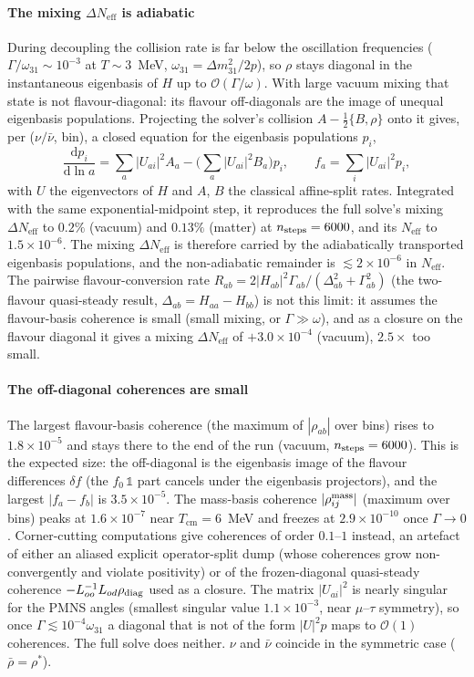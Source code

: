 \documentclass[11pt]{article}
\newcommand{\Neff}{N_{\mathrm{eff}}}
\newcommand{\Tcm}{T_{\mathrm{cm}}}
\newcommand{\dd}{\mathrm{d}}
\newcommand{\dNeff}{\Delta\Neff}
\begin{document}
\paragraph{The mixing $\dNeff$ is adiabatic}
During decoupling the collision rate is far below the oscillation frequencies
($\Gamma/\omega_{31}\sim10^{-3}$ at $T\sim3$~MeV, $\omega_{31}=\Delta m^2_{31}/2p$), so $\rho$ stays
diagonal in the instantaneous eigenbasis of $H$ up to $\mathcal O(\Gamma/\omega)$.  With large
vacuum mixing that state is not flavour-diagonal: its flavour off-diagonals are the image of
unequal eigenbasis populations.  Projecting the solver's collision $A-\tfrac12\{B,\rho\}$ onto it
gives, per ($\nu/\bar\nu$, bin), a closed equation for the eigenbasis populations $p_i$,
\begin{equation*}
\frac{\dd p_i}{\dd\ln a}=\sum_a|U_{ai}|^2A_a-\Big(\sum_a|U_{ai}|^2B_a\Big)p_i,\qquad
f_a=\sum_i|U_{ai}|^2p_i,
\end{equation*}
with $U$ the eigenvectors of $H$ and $A$, $B$ the classical affine-split rates.  Integrated with
the same exponential-midpoint step, it reproduces the full solve's mixing $\dNeff$ to $0.2\%$
(vacuum) and $0.13\%$ (matter) at $n_{\rm steps}=6000$, and its $\Neff$ to
$1.5\times10^{-6}$.  The mixing $\dNeff$ is therefore carried by the adiabatically transported
eigenbasis populations, and the non-adiabatic remainder is $\lesssim2\times10^{-6}$ in $\Neff$.
The pairwise flavour-conversion rate $R_{ab}=2|H_{ab}|^2\Gamma_{ab}/(\Delta_{ab}^2+\Gamma_{ab}^2)$
(the two-flavour quasi-steady result, $\Delta_{ab}=H_{aa}-H_{bb}$) is not this limit: it assumes the
flavour-basis coherence is small (small mixing, or $\Gamma\gg\omega$), and as a closure on the
flavour diagonal it gives a mixing $\dNeff$ of $+3.0\times10^{-4}$ (vacuum), $2.5\times$ too small.

\paragraph{The off-diagonal coherences are small}
The largest flavour-basis coherence (the maximum of $|\rho_{ab}|$ over bins) rises to
$1.8\times10^{-5}$ and stays there to the end of the run (vacuum, $n_{\rm steps}=6000$).  This is
the expected size: the off-diagonal is the eigenbasis image of the flavour differences $\delta f$
(the $f_0\,\mathbb 1$ part cancels under the eigenbasis projectors), and the largest $|f_a-f_b|$ is
$3.5\times10^{-5}$.  The mass-basis coherence $|\rho^{\rm mass}_{ij}|$ (maximum over bins) peaks at
$1.6\times10^{-7}$ near $\Tcm=6$~MeV and freezes at $2.9\times10^{-10}$ once $\Gamma\to0$.
Corner-cutting computations give coherences of order $0.1$--$1$ instead, an artefact of either an
aliased explicit operator-split dump (whose coherences grow non-convergently and violate
positivity) or of the frozen-diagonal quasi-steady coherence $-L_{oo}^{-1}L_{od}\rho_{\rm diag}$
used as a closure.  The matrix $|U_{ai}|^2$ is nearly singular for the PMNS angles (smallest
singular value $1.1\times10^{-3}$, near $\mu$--$\tau$ symmetry), so once
$\Gamma\lesssim10^{-4}\omega_{31}$ a diagonal that is not of the form $|U|^2p$ maps to $\mathcal
O(1)$ coherences.  The full solve does neither.  $\nu$ and $\bar\nu$ coincide in the symmetric
case ($\bar\rho=\rho^\ast$).
\end{document}
